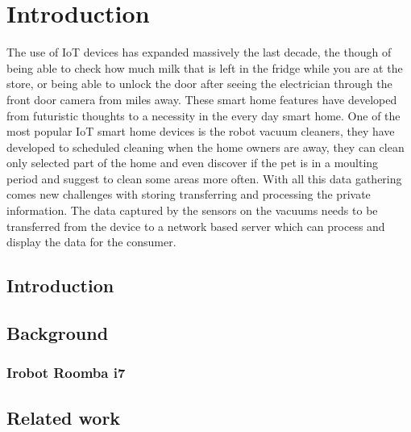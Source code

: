 \chapter{Introduction}

The use of IoT devices has expanded massively the last decade, the though of being able to check how much milk that is left in the fridge while you are at the store, or being able to unlock the door after seeing the electrician through the front door camera from miles away. These smart home features have developed from futuristic thoughts to a necessity in the every day smart home. One of the most popular IoT smart home devices is the robot vacuum cleaners, they have developed to scheduled cleaning when the home owners are away, they can clean only selected part of the home and even discover if the pet is in a moulting period and suggest to clean some areas more often. With all this data gathering comes new challenges with storing transferring and processing the private information. The data captured by the sensors on the vacuums needs to be transferred from the device to a network based server which can process and display the data for the consumer. 


\section{Introduction}


\section{Background}

\subsection{Irobot Roomba i7}



\section{Related work}